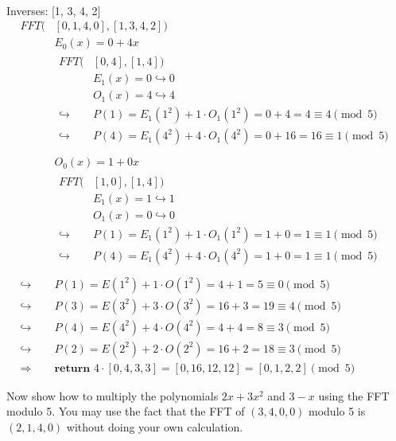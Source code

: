 \documentclass[11pt]{article}
\begin{document}
\begin{subparts}
\begin{solution}\\
    Inverses: [1, 3, 4, 2]
    \begin{align*}
       FFT(&[0, 1, 4, 0], [1, 3, 4, 2])\\
        &E_0(x) = 0 + 4x\\
        &\begin{aligned}
            FFT(&[0, 4], [1, 4])\\
            &E_1(x) = 0 \hookrightarrow 0\\
            &O_1(x) = 4 \hookrightarrow 4\\
            \hookrightarrow &P(1) = E_1(1^2) + 1 \cdot O_1(1^2) = 0 + 4 = 4 \equiv 4 \pmod5\\
            \hookrightarrow &P(4) = E_1(4^2) + 4 \cdot O_1(4^2) = 0 + 16 = 16 \equiv 1 \pmod5\\
        \end{aligned} \\
        &O_0(x) = 1 + 0x\\
        &\begin{aligned}
            FFT(&[1, 0], [1, 4])\\
            &E_1(x) = 1 \hookrightarrow 1\\
            &O_1(x) = 0 \hookrightarrow 0\\
            \hookrightarrow &P(1) = E_1(1^2) + 1 \cdot O_1(1^2) = 1 + 0 = 1 \equiv 1 \pmod5\\
            \hookrightarrow &P(4) = E_1(4^2) + 4 \cdot O_1(4^2) = 1 + 0 = 1 \equiv 1 \pmod5\\
        \end{aligned} \\
        \hookrightarrow &P(1) = E(1^2) + 1 \cdot O(1^2) = 4 + 1 = 5 \equiv 0 \pmod5\\
        \hookrightarrow &P(3) = E(3^2) + 3 \cdot O(3^2) = 16 + 3 = 19 \equiv 4 \pmod5\\
        \hookrightarrow &P(4) = E(4^2) + 4 \cdot O(4^2) = 4 + 4 = 8 \equiv 3 \pmod5\\
        \hookrightarrow &P(2) = E(2^2) + 2 \cdot O(2^2) = 16 + 2 = 18 \equiv 3 \pmod5\\
        \Rightarrow &\textbf{return }4\cdot[0, 4, 3, 3] = [0, 16, 12, 12] = \boxed{[0, 1, 2, 2] \pmod 5}
    \end{align*}
\end{solution}
\subpart Now show how to multiply the polynomials $2x + 3x^2$ and $3 - x$ using the FFT modulo 5. You may use the fact that the FFT of $(3, 4, 0, 0)$ modulo 5 is $(2, 1, 4, 0)$ without doing your own calculation.\\

\end{subparts}
\end{document}
